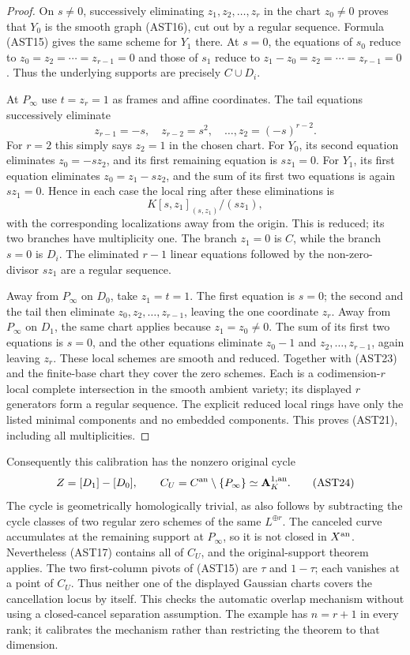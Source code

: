 \begin{proof}
On $s\ne0$, successively eliminating $z_1,z_2,\ldots,z_r$
in the chart $z_0\ne0$ proves that $Y_0$ is the smooth graph
(AST16), cut out by a regular sequence.  Formula (AST15)
gives the same scheme for $Y_1$ there.  At $s=0$, the equations
of $s_0$ reduce to $z_0=z_2=\cdots=z_{r-1}=0$ and those of
$s_1$ reduce to $z_1-z_0=z_2=\cdots=z_{r-1}=0$.
Thus the underlying supports are precisely $C\cup D_i$.

At $P_\infty$ use $t=z_r=1$ as frames and affine coordinates.
The tail equations successively eliminate
\[
             z_{r-1}=-s,\quad z_{r-2}=s^2,\quad\ldots,
                         z_2=(-s)^{r-2}.
 \tag{AST22}
\]
For $r=2$ this simply says $z_2=1$ in the chosen chart.
For $Y_0$, its second equation eliminates
$z_0=-s z_2$, and its first remaining equation is $s z_1=0$.
For $Y_1$, its first equation eliminates
$z_0=z_1-s z_2$, and the sum of its first two equations is
again $s z_1=0$.  Hence in each case the local ring after
these eliminations is
\[
                         K[s,z_1]_{(s,z_1)}/(s z_1),
 \tag{AST23}
\]
with the corresponding localizations away from the origin.
This is reduced; its two branches have multiplicity one.
The branch $z_1=0$ is $C$, while the branch $s=0$ is $D_i$.
The eliminated $r-1$ linear equations followed by the
non-zero-divisor $s z_1$ are a regular sequence.

Away from $P_\infty$ on $D_0$, take $z_1=t=1$.
The first equation is $s=0$; the second and the tail then
eliminate $z_0,z_2,\ldots,z_{r-1}$, leaving the one coordinate
$z_r$.  Away from $P_\infty$ on $D_1$, the same chart applies
because $z_1=z_0\ne0$.  The sum of its first two equations
is $s=0$, and the other equations eliminate $z_0-1$ and
$z_2,\ldots,z_{r-1}$, again leaving $z_r$.
These local schemes are smooth and reduced.  Together with
(AST23) and the finite-base chart they cover the zero schemes.
Each is a codimension-$r$ local complete intersection in the
smooth ambient variety; its displayed $r$ generators form a
regular sequence.  The explicit reduced local rings have only
the listed minimal components and no embedded components.
This proves (AST21), including all multiplicities.
\end{proof}

Consequently this calibration has the nonzero original cycle
\[
                  Z=[D_1]-[D_0],\qquad
                  C_U=C^{\rm an}\setminus\{P_\infty\}
                                      \simeq\mathbf A^{1,\rm an}_K.
 \tag{AST24}
\]
The cycle is geometrically homologically trivial, as also follows
by subtracting the cycle classes of two regular zero schemes
of the same $L^{\oplus r}$.  The canceled curve accumulates at
the remaining support at $P_\infty$, so it is not closed in
$X^{\rm an}$.  Nevertheless (AST17) contains all of $C_U$,
and the original-support theorem applies.  The two first-column
pivots of (AST15) are $\tau$ and $1-\tau$; each vanishes at a
point of $C_U$.  Thus neither one of the displayed Gaussian
charts covers the cancellation locus by itself.  This checks
the automatic overlap mechanism without using a closed-cancel
separation assumption.  The example has $n=r+1$ in every rank;
it calibrates the mechanism rather than restricting the theorem
to that dimension.

